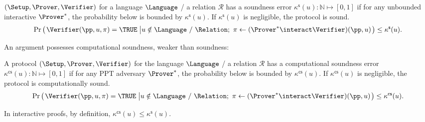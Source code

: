\begin{definition}
	\label{def:soundness}
	$(\Setup, \Prover, \Verifier)$ for a language $\Language$ / a relation $\mathcal{R}$ has a soundness error $\kappa^\mathsf{s}(u)\colon \mathbb{N} \mapsto [0, 1]$ if for any unbounded interactive $\Prover^*$, the probability 
	below
	is bounded by $\kappa^\mathsf{s}(u)$.
	If $\kappa^\mathsf{s}(u)$ is negligible,
	the protocol is sound.
	\begin{equation*}
	\Pr
		\left(
			\left.
			\begin{aligned}
				& \Verifier(\pp, u, \pi) = \TRUE \\
			\end{aligned}
			\right.
			\left|
			\begin{aligned}
				& u \notin \Language~/~ \Relation;~ \pi \leftarrow (\Prover^* \interact \Verifier) (\pp, u) \\
			\end{aligned}
			\right.
		\right)
	\le \kappa^\mathsf{s}(u).
	\end{equation*}
\end{definition}

An argument possesses computational soundness,
weaker than soundness:
\begin{definition}
	\label{def:ComputationalSoundness}
	A protocol $(\Setup,\Prover,\Verifier)$ for the language $\Language$
    / a relation $\mathcal{R}$ has
	a computational soundness error $\kappa^\mathsf{cs}(u)\colon \mathbb{N} \mapsto [0, 1]$ if for any PPT adversary $\Prover^*$, the probability below
	is bounded by $\kappa^\mathsf{cs}(u)$.
	If $\kappa^\mathsf{cs}(u)$ is negligible, the protocol is computationally sound.
	\begin{equation*}
	\Pr
		\left(
			\left.
			\begin{aligned}
				& \Verifier(\pp, u, \pi) = \TRUE \\
			\end{aligned}
			\right.
			\left|
			\begin{aligned}
				& u \notin \Language~/~\Relation;~ \pi \leftarrow (\Prover^* \interact \Verifier)(\pp, u) \\
			\end{aligned}
			\right.
		\right)
	\le \kappa^\mathsf{cs}(u).
	\end{equation*}
\end{definition}
In interactive proofs, by definition, $\kappa^\mathsf{cs}(u) \le \kappa^\mathsf{s}(u)$.

